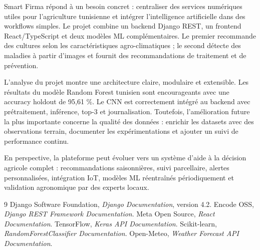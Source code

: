 \documentclass[12pt,a4paper]{report}
\begin{document}
Smart Firma répond à un besoin concret : centraliser des services numériques utiles pour l'agriculture tunisienne et intégrer l'intelligence artificielle dans des workflows simples. Le projet combine un backend Django REST, un frontend React/TypeScript et deux modèles ML complémentaires. Le premier recommande des cultures selon les caractéristiques agro-climatiques ; le second détecte des maladies à partir d'images et fournit des recommandations de traitement et de prévention.

L'analyse du projet montre une architecture claire, modulaire et extensible. Les résultats du modèle Random Forest tunisien sont encourageants avec une accuracy holdout de 95,61 \%. Le CNN est correctement intégré au backend avec prétraitement, inférence, top-3 et journalisation. Toutefois, l'amélioration future la plus importante concerne la qualité des données : enrichir les datasets avec des observations terrain, documenter les expérimentations et ajouter un suivi de performance continu.

En perspective, la plateforme peut évoluer vers un système d'aide à la décision agricole complet : recommandations saisonnières, suivi parcellaire, alertes personnalisées, intégration IoT, modèles ML réentraînés périodiquement et validation agronomique par des experts locaux.

\begin{thebibliography}{9}
 Django Software Foundation, \textit{Django Documentation}, version 4.2.
 Encode OSS, \textit{Django REST Framework Documentation}.
 Meta Open Source, \textit{React Documentation}.
 TensorFlow, \textit{Keras API Documentation}.
 Scikit-learn, \textit{RandomForestClassifier Documentation}.
 Open-Meteo, \textit{Weather Forecast API Documentation}.
\end{thebibliography}

\appendix
\end{document}
